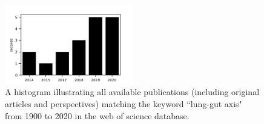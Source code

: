 \begin{figure}[ht]
	\centering
	\includegraphics[width=0.5\textwidth]{./image/bar-papers.png}
	\caption{A histogram illustrating all available publications (including original articles and perspectives) matching the keyword ``lung-gut axis" from 1900 to 2020 in the web of science database.}
	\label{ch2_fig1}
\end{figure}